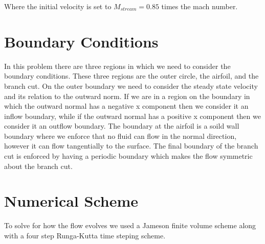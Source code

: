 \documentclass[a4paper,12pt,titlepage]{article}
\begin{document}
Where the initial velocity is set to $M_{stream} = 0.85$ times the mach number.  

\section{Boundary Conditions}
In this problem there are three regions in which we need to consider the boundary conditions.  These three regions are the outer circle, the airfoil, and the branch cut.  On the outer boundary we need to consider the steady state velocity and its relation to the outward norm.  If we are in a region on the boundary in which the outward normal has a negative x component then we consider it an inflow boundary, while if the outward normal has a positive x component then we consider it an outflow boundary.  The boundary at the airfoil is a soild wall boundary where we enforce that no fluid can flow in the normal direction, however it can flow tangentially to the surface.  The final boundary of the branch cut is enforced by having a periodic boundary which makes the flow symmetric about the branch cut.  

\section{Numerical Scheme}
To solve for how the flow evolves we used a Jameson finite volume scheme along with a four step Runga-Kutta time steping scheme.    
\end{document}
